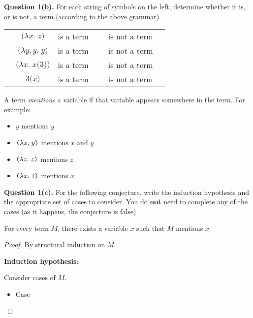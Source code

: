 \textbf{Question 1(b).} For each string of symbols on the left, determine whether it is, or is not, a term (according to the above grammar).

\medskip

\begin{tabular}{rcll}
&  $\texttt(\lambda x.\;z\texttt)$ &  is a term~~~~~is not a term
\\[1ex]
&  $\texttt(\lambda y, y.\;y\texttt)$ & is a term~~~~~is not a term
\\[1ex]
&  $\texttt(\lambda x.\;x\texttt(3\texttt)\texttt)$ &  is a term~~~~~is not a term
\\[1ex]
&  $3\texttt(x\texttt)$ & is a term~~~~~is not a term
\end{tabular}

\clearpage

A term \emph{mentions} a variable if that variable appears somewhere in the term.
For example:

\begin{itemize}
\item  $y$ mentions $y$
\item  $\texttt(\lambda{x}.\;{y}\texttt)$ mentions $x$ and $y$
\item  $\texttt(\lambda{z}.\;{z}\texttt)$ mentions $z$
\item  $\texttt(\lambda{x}.\;{1}\texttt)$ mentions $x$
\end{itemize}


\textbf{Question 1(c).}
For the following conjecture, write the induction hypothesis and the appropriate set
of cases to consider.  You do \textbf{not} need to complete any of the cases (as it happens, the conjecture is false).

\begin{conjecture*}
  For every term $M$, there exists a variable $x$ such that $M$ mentions $x$.
\end{conjecture*}
\begin{proof}
  By structural induction on $M$.

  \medskip

  \textbf{Induction hypothesis}:

  \vspace*{10ex}


  Consider cases of $M$.

  \begin{itemize}
  \item Case



  \vspace*{33ex}
  \end{itemize}
\end{proof}





